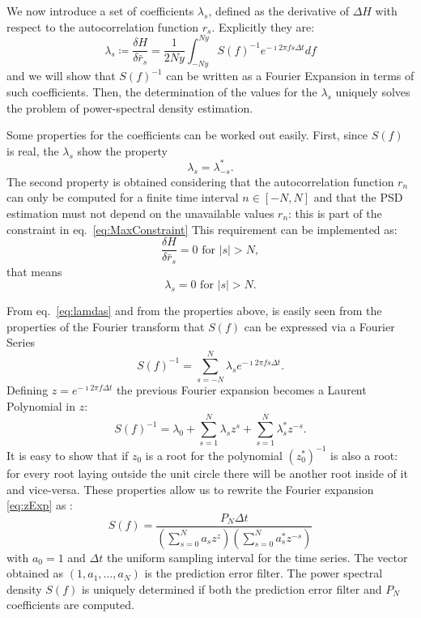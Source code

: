 \documentclass[twocolumn,showpacs,preprintnumbers,nofootinbib,prd,
superscriptaddress,10pt]{revtex4-1}
\begin{document}
We now introduce a set of coefficients $\lambda_s$, defined as the derivative of $\Delta H$ with respect to the autocorrelation function $r_s$.
Explicitly they are:
\begin{equation} \label{eq:lamdas}
      \lambda_s \coloneqq \frac{\delta H}{\delta \bar r_s} = \frac{1}{2Ny}\int_{-Ny}^{Ny} S(f)^{-1}e^{-\imath 2 \pi f s \Delta t } df
\end{equation} 
and we will show that $S(f)^{-1}$ can be written as a Fourier Expansion in terms of such coefficients. Then, the determination of the values for the $\lambda_s$ uniquely solves the problem of power-spectral density estimation.

Some properties for the coefficients can be worked out easily. First, since $S(f)$ is real, the $\lambda_s$ show the property 
\begin{equation}
	\nonumber 
	\lambda_s = \lambda_{-s}^*. 
\end{equation}
The second property is obtained considering that the autocorrelation function $r_n$ can only be computed for a finite time interval $n \in [-N, N]$ and that the PSD estimation must not depend on the unavailable values $r_n$: this is part of the constraint in eq.~\eqref{eq:MaxConstraint}
This requirement can be implemented as:  
\begin{equation}\nonumber 
    \frac{\delta H}{\delta \bar r_s} = 0 \text{ for } \vert s \vert > N,
\end{equation}
that means 
\begin{equation}
\nonumber 
\lambda_s = 0 \text{ for } \vert s \vert > N. 
\end{equation}

From eq.~\eqref{eq:lamdas} and from the properties above, is easily seen from the properties of the Fourier transform that $S(f)$ can be expressed via a Fourier Series 
\begin{equation}\label{eq:PSDconstraint}
    S(f)^{-1} = \sum_{s = -N}^N \lambda_s e^{-\imath 2 \pi f s \Delta t}.
\end{equation}
Defining $z = e^{-\imath 2 \pi f \Delta t}$ the previous Fourier expansion becomes a Laurent Polynomial in $z$: 
\begin{equation}
    \label{eq:zExp}
    S(f)^{-1} = \lambda_0 + \sum_{s = 1}^N \lambda_s z^s + \sum_{s = 1}^N \lambda^*_s z^{-s}.
\end{equation}
It is easy to show that if $z_0$ is a root for the polynomial $(z_0^*)^{-1}$ is also a root: for every root laying outside the unit circle there will be another root inside of it and vice-versa. These properties allow us to rewrite the Fourier expansion \eqref{eq:zExp} as \cite{1975STIN...7714318B}:
\begin{equation}\label{eq:MESApsd_appendix}
    S(f) = \frac{P_N \Delta t}{\left(\sum_{s=0}^N a_s z^z\right)\left(\sum_{s = 0}^N a^*_s z^{-s}\right)}
\end{equation}
with $a_0 = 1$ and $\Delta t$ the uniform sampling interval for the time series. The vector obtained as $(1, a_1, \dots, a_N)$ is the prediction error filter. The power spectral density $S(f)$ is uniquely determined if both the prediction error filter and $P_N$ coefficients are computed.
\end{document}
